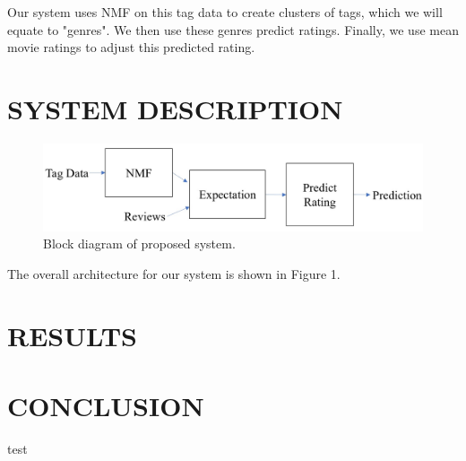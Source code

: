 \documentclass[letterpaper, 10 pt, conference]{ieeeconf}  %
\begin{document}
Our system uses NMF on this tag data to create clusters of tags, which we will equate to "genres". We then use these genres predict ratings. Finally, we use mean movie ratings to adjust this predicted rating.


\section{SYSTEM DESCRIPTION}

\begin{figure}[h]
   \includegraphics[scale=0.5]{blockdiagram.jpeg}
   \caption{Block diagram of proposed system.}
\end{figure}


The overall architecture for our system is shown in Figure 1.


\section{RESULTS}

\section{CONCLUSION}



\begin{thebibliography}{99}
    test


\end{thebibliography}
\end{document}
